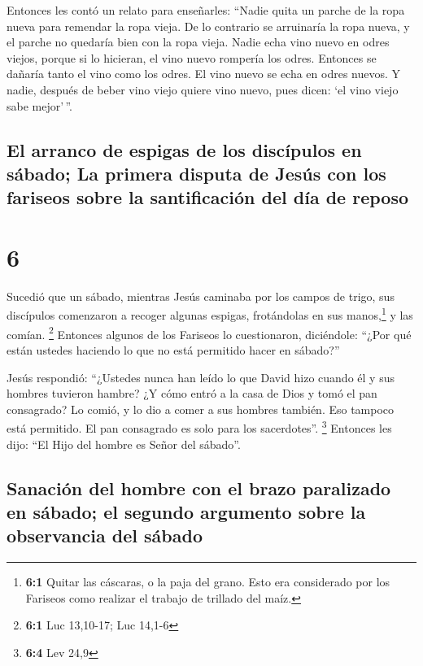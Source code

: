  Entonces les contó un relato para enseñarles: ``Nadie
quita un parche de la ropa nueva para remendar la ropa vieja. De lo
contrario se arruinaría la ropa nueva, y el parche no quedaría bien con
la ropa vieja.  Nadie echa vino nuevo en odres viejos,
porque si lo hicieran, el vino nuevo rompería los odres. Entonces se
dañaría tanto el vino como los odres.  El vino nuevo se
echa en odres nuevos.  Y nadie, después de beber vino
viejo quiere vino nuevo, pues dicen: `el vino viejo sabe mejor'\,''.

\hypertarget{el-arranco-de-espigas-de-los-discuxedpulos-en-suxe1bado-la-primera-disputa-de-jesuxfas-con-los-fariseos-sobre-la-santificaciuxf3n-del-duxeda-de-reposo}{%
\subsection{El arranco de espigas de los discípulos en sábado; La
primera disputa de Jesús con los fariseos sobre la santificación del día
de
reposo}\label{el-arranco-de-espigas-de-los-discuxedpulos-en-suxe1bado-la-primera-disputa-de-jesuxfas-con-los-fariseos-sobre-la-santificaciuxf3n-del-duxeda-de-reposo}}

\hypertarget{section-5}{%
\section{6}\label{section-5}}

 Sucedió que un sábado, mientras Jesús caminaba por los
campos de trigo, sus discípulos comenzaron a recoger algunas espigas,
frotándolas en sus manos,\footnote{\textbf{6:1} Quitar las cáscaras, o
  la paja del grano. Esto era considerado por los Fariseos como realizar
  el trabajo de trillado del maíz.} y las comían. \footnote{\textbf{6:1}
  Luc 13,10-17; Luc 14,1-6}  Entonces algunos de los
Fariseos lo cuestionaron, diciéndole: ``¿Por qué están ustedes haciendo
lo que no está permitido hacer en sábado?''

 Jesús respondió: ``¿Ustedes nunca han leído lo que David
hizo cuando él y sus hombres tuvieron hambre?  ¿Y cómo
entró a la casa de Dios y tomó el pan consagrado? Lo comió, y lo dio a
comer a sus hombres también. Eso tampoco está permitido. El pan
consagrado es solo para los sacerdotes''. \footnote{\textbf{6:4} Lev
  24,9}  Entonces les dijo: ``El Hijo del hombre es Señor
del sábado''.

\hypertarget{sanaciuxf3n-del-hombre-con-el-brazo-paralizado-en-suxe1bado-el-segundo-argumento-sobre-la-observancia-del-suxe1bado}{%
\subsection{Sanación del hombre con el brazo paralizado en sábado; el
segundo argumento sobre la observancia del
sábado}\label{sanaciuxf3n-del-hombre-con-el-brazo-paralizado-en-suxe1bado-el-segundo-argumento-sobre-la-observancia-del-suxe1bado}}

